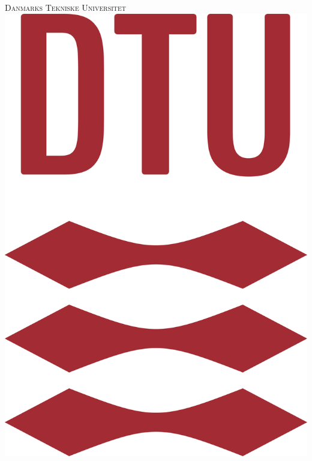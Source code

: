 \begin{titlepage} %
	\newcommand{\HRule}{\rule{\linewidth}{0.5mm}} %
	
	\center %
	   
	
	
	\textsc{\LARGE Danmarks Tekniske Universitet}\\[1.5cm] %
	
    \includegraphics[scale=0.15]{images/DTULogo.png}\\
	

\end{titlepage}
